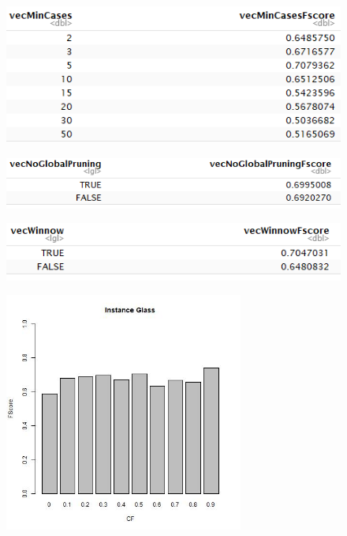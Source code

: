 \documentclass[12pt,a4paper]{article}
\begin{document}
\begin{figure}[H]
\centering
\includegraphics{glassDTminCases.png}
\end{figure}

\begin{figure}[H]
\centering
\includegraphics{glassDTnoGlobalPruning.PNG}
\end{figure}

\begin{figure}[H]
\centering
\includegraphics{glassDTwinnow.PNG}
\end{figure}

\begin{figure}[H]
\centering
\includegraphics[width=0.7\textwidth]{glassFScoreCF.jpg}
\end{figure}
\end{document}
